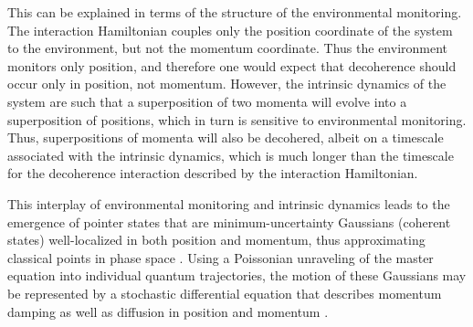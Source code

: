 \documentclass[3p,sort&compress,12pt]{elsarticle}
\begin{document}
This can be explained in terms of the structure of the environmental monitoring. The interaction Hamiltonian couples only the position coordinate of the system to the environment, but not the momentum coordinate. Thus the environment monitors only position, and therefore one would expect that decoherence should occur only in position, not momentum. However, the intrinsic dynamics of the system are such that a superposition of two momenta will evolve into a superposition of positions, which in turn is sensitive to environmental monitoring. Thus, superpositions of momenta will also be decohered, albeit on a timescale associated with the intrinsic dynamics, which  is much longer than the timescale for the decoherence interaction described by the interaction Hamiltonian. 

This interplay of environmental monitoring and intrinsic dynamics leads to the emergence of pointer states that are minimum-uncertainty Gaussians (coherent states) well-localized in both position and momentum, thus approximating classical points in phase space \cite{Kubler:1973:ux,Paz:1993:ta,Zurek:1993:pu,Zurek:2002:ii,Diosi:2000:yn,Joos:2003:jh,Eisert:2003:ib,Sorgel:2015:pp}. Using a Poissonian unraveling of the master equation into individual quantum trajectories, the motion of these Gaussians may be represented by a stochastic differential equation that describes momentum damping as well as diffusion in position and momentum \cite{Sorgel:2015:pp}. 
\end{document}
